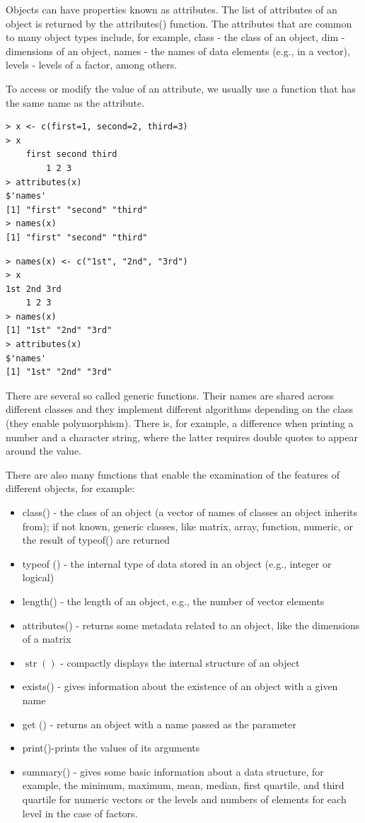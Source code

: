 \documentclass[10pt]{book}
\begin{document}
Objects can have properties known as attributes. The list of attributes of an object is returned by the attributes() function. The attributes that are common to many object types include, for example, class - the class of an object, dim - dimensions of an object, names - the names of data elements (e.g., in a vector), levels - levels of a factor, among others.

To access or modify the value of an attribute, we usually use a function that has the same name as the attribute.

\begin{verbatim}
> x <- c(first=1, second=2, third=3)
> x
    first second third
        1 2 3
> attributes(x)
$'names'
[1] "first" "second" "third"
> names(x)
[1] "first" "second" "third"
\end{verbatim}

\begin{verbatim}
> names(x) <- c("1st", "2nd", "3rd")
> x
1st 2nd 3rd
    1 2 3
> names(x)
[1] "1st" "2nd" "3rd"
> attributes(x)
$'names'
[1] "1st" "2nd" "3rd"
\end{verbatim}

There are several so called generic functions. Their names are shared across different classes and they implement different algorithms depending on the class (they enable polymorphism). There is, for example, a difference when printing a number and a character string, where the latter requires double quotes to appear around the value.

There are also many functions that enable the examination of the features of different objects, for example:

\begin{itemize}
  \item class() - the class of an object (a vector of names of classes an object inherits from); if not known, generic classes, like matrix, array, function, numeric, or the result of typeof() are returned
  \item typeof () - the internal type of data stored in an object (e.g., integer or logical)
  \item length() - the length of an object, e.g., the number of vector elements
  \item attributes() - returns some metadata related to an object, like the dimensions of a matrix
  \item $\operatorname{str}()$ - compactly displays the internal structure of an object
  \item exists() - gives information about the existence of an object with a given name
  \item get () - returns an object with a name passed as the parameter
  \item print()-prints the values of its arguments
  \item summary() - gives some basic information about a data structure, for example, the minimum, maximum, mean, median, first quartile, and third quartile for numeric vectors or the levels and numbers of elements for each level in the case of factors.
\end{itemize}
\end{document}
